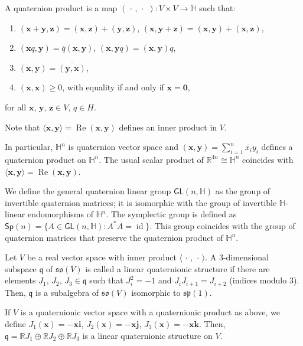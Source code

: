 \documentclass[12pt, a4paper]{amsart}
\newcommand{\id}{\operatorname{id}}
\newcommand{\g}{\mathfrak}
\newcommand{\R}{\mathbb{R}}
\renewcommand{\H}{\mathbb{H}}
\renewcommand{\Re}{\operatorname{Re}}
\theoremstyle{remark}
\begin{document}
A quaternion product is a map $(\,\cdot\,,\,\cdot\,\,)\colon V\times V\to\H$ such that:
\begin{enumerate}
\item $(\mathbf{x}+\mathbf{y},\mathbf{z})
=(\mathbf{x},\mathbf{z})+(\mathbf{y},\mathbf{z})$,
$(\mathbf{x},\mathbf{y}+\mathbf{z})
=(\mathbf{x},\mathbf{y})+(\mathbf{x},\mathbf{z})$,
\item $(\mathbf{x}q,\mathbf{y})=\overline{q}(\mathbf{x},\mathbf{y})$, $(\mathbf{x},\mathbf{y}q)=(\mathbf{x},\mathbf{y}) q$,
\item $(\mathbf{x},\mathbf{y})=\overline{(\mathbf{y},\mathbf{x})}$,
\item $(\mathbf{x},\mathbf{x})\geq 0$, with equality if and only if $\mathbf{x}=\mathbf{0}$,
\end{enumerate}
for all $\mathbf{x}$, $\mathbf{y}$, $\mathbf{z}\in V$, $q\in H$.

Note that $\langle\mathbf{x},\mathbf{y}\rangle=\Re(\mathbf{x},\mathbf{y})$ defines an inner product in $V$.

In particular, $\H^n$ is quaternion vector space and $(\mathbf{x},\mathbf{y})=\sum_{i=1}^n \overline{x_i}y_i$ defines a quaternion product on $\H^n$. The usual scalar product of $\R^{4n}\cong\H^n$ coincides with $\langle\mathbf{x},\mathbf{y}\rangle=\Re(\mathbf{x},\mathbf{y})$.


We define the general quaternion linear group $\mathsf{GL}(n,\H)$ as the group of invertible quaternion matrices; it is isomorphic with the group of invertible $\H$-linear endomorphisms of $\H^n$. 
The symplectic group is defined as $\mathsf{Sp}(n)=\{A\in\mathsf{GL}(n,\H):A^* A=\id\}$.
This group coincides with the group of quaternion matrices that preserve the quaternion product of $\H^n$.	

\medskip

Let $V$ be a real vector space with inner product $\langle\,\cdot\,,\,\cdot\,\rangle$.
A $3$-dimensional subspace $\g{q}$ of $\g{so}(V)$ is called a linear quaternionic structure if there are elements $J_1$, $J_2$, $J_3\in\g{q}$ such that $J_i^2=-1$ and $J_iJ_{i+1}=J_{i+2}$ (indices modulo 3).
Then, $\g{q}$ is a subalgebra of $\g{so}(V)$ isomorphic to $\g{sp}(1)$.

If $V$ is a quaternionic vector space with a quaternionic product as above, we define $J_1(\mathbf{x})=-\mathbf{x}\mathbf{i}$, $J_2(\mathbf{x})=-\mathbf{x}\mathbf{j}$, $J_3(\mathbf{x})=-\mathbf{x}\mathbf{k}$.
Then, $\g{q}=\R J_1\oplus\R J_2\oplus\R J_3$ is a linear quaternionic structure on $V$.
\end{document}
